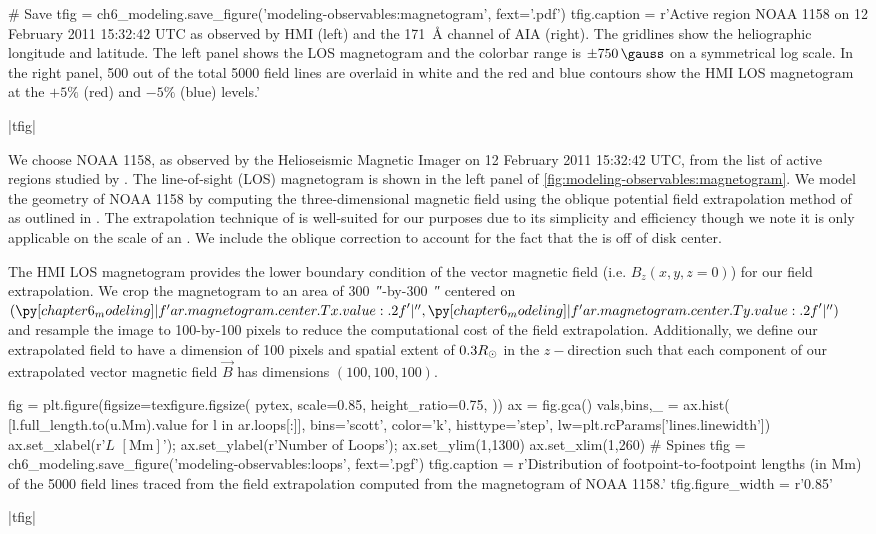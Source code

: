 \begin{pycode}
# Save
tfig = ch6_modeling.save_figure('modeling-observables:magnetogram', fext='.pdf')
tfig.caption = r'Active region NOAA 1158 on 12 February 2011 15:32:42 UTC as observed by HMI (left) and the \SI{171}{\angstrom} channel of AIA (right). The gridlines show the heliographic longitude and latitude. The left panel shows the LOS magnetogram and the colorbar range is $\pm\SI{750}{\gauss}$ on a symmetrical log scale. In the right panel, 500 out of the total 5000 field lines are overlaid in white and the red and blue contours show the HMI LOS magnetogram at the $+5\%$ (red) and $-5\%$ (blue) levels.'
\end{pycode}
|tfig|

We choose \AR{} NOAA 1158, as observed by the Helioseismic Magnetic Imager \citep[HMI,][]{hoeksema_helioseismic_2014} on 12 February 2011 15:32:42 UTC, from the list of active regions studied by \citet{warren_systematic_2012}. The line-of-sight (LOS) magnetogram is shown in the left panel of \autoref{fig:modeling-observables:magnetogram}. We model the geometry of \AR{} NOAA 1158 by computing the three-dimensional magnetic field using the oblique potential field extrapolation method of \citet{schmidt_observable_1964} as outlined in \citet[section 3]{sakurai_greens_1982}. The extrapolation technique of \citeauthor{schmidt_observable_1964} is well-suited for our purposes due to its simplicity and efficiency though we note it is only applicable on the scale of an \AR{}. We include the oblique correction to account for the fact that the \AR{} is off of disk center. 

The HMI LOS magnetogram provides the lower boundary condition of the vector magnetic field (i.e. $B_z(x,y,z=0)$) for our field extrapolation. We crop the magnetogram to an area of \SI{300}{\arcsecond}-by-\SI{300}{\arcsecond} centered on $(\py[chapter6_modeling]|f'{ar.magnetogram.center.Tx.value:.2f}'|\si{\arcsecond},\py[chapter6_modeling]|f'{ar.magnetogram.center.Ty.value:.2f}'|\si{\arcsecond})$ and resample the image to 100-by-100 pixels to reduce the computational cost of the field extrapolation. Additionally, we define our extrapolated field to have a dimension of 100 pixels and spatial extent of $0.3R_{\odot}$ in the $z-$direction such that each component of our extrapolated vector magnetic field $\vec{B}$ has dimensions $(100,100,100)$.

\begin{pycode}
fig = plt.figure(figsize=texfigure.figsize(
    pytex,
    scale=0.85,
    height_ratio=0.75,
))
ax = fig.gca()
vals,bins,_ = ax.hist(
    [l.full_length.to(u.Mm).value for l in ar.loops[:]],
    bins='scott', color='k', histtype='step', lw=plt.rcParams['lines.linewidth'])
ax.set_xlabel(r'$L$ $[\si{\mega\m}]$');
ax.set_ylabel(r'Number of Loops');
ax.set_ylim(1,1300)
ax.set_xlim(1,260)
# Spines
tfig = ch6_modeling.save_figure('modeling-observables:loops', fext='.pgf')
tfig.caption = r'Distribution of footpoint-to-footpoint lengths (in Mm) of the 5000 field lines traced from the field extrapolation computed from the magnetogram of NOAA 1158.'
tfig.figure_width = r'0.85\textwidth'
\end{pycode}
|tfig|

